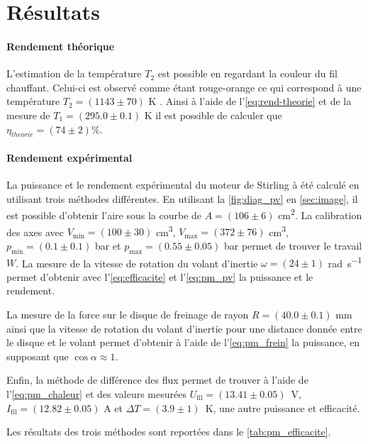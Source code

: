 \section{Résultats}

\paragraph*{Rendement théorique}
L'estimation de la température \(T_2\) est possible en regardant la couleur du fil chauffant. Celui-ci est observé comme étant rouge-orange ce qui correspond à une température \(T_2 = (1143 \pm 70)\) \si{\kelvin} \cite{temp-fil}. Ainsi à l'aide de l'\autoref{eq:rend-theorie} et de la mesure de \(T_1 = (295.0 \pm 0.1)\) \si{\kelvin} il est possible de calculer que \(\eta_{theorie} = (74 \pm 2)\)\%.

\paragraph*{Rendement expérimental}
La puissance et le rendement expérimental du moteur de Stirling à été calculé en utilisant trois méthodes différentes. En utilisant la \autoref{fig:diag_pv} en \autoref{sec:image}, il est possible d'obtenir l'aire sous la courbe de \(A = (106 \pm 6)\) \si{\centi\meter\squared}. La calibration des axes avec \(V_\textrm{min} = (100 \pm 30)\) \si{\centi\meter\cubed}, \(V_\textrm{max} = (372 \pm 76)\) \si{\centi\meter\cubed}, \(p_\textrm{min} = (0.1 \pm 0.1)\) \si{\bar} et \(p_\textrm{max} = (0.55 \pm 0.05)\) \si{\bar} permet de trouver le travail \(W\). La mesure de la vitesse de rotation du volant d'inertie \(\omega = (24 \pm 1)\) \si{\radian\per\second} permet d'obtenir avec l'\autoref{eq:efficacite} et l'\autoref{eq:pm_pv} la puissance et le rendement.

La mesure de la force sur le disque de freinage de rayon \(R = (40.0 \pm 0.1)\) \si{\milli\meter} ainsi que la vitesse de rotation du volant d'inertie pour une distance donnée entre le disque et le volant permet d'obtenir à l'aide de l'\autoref{eq:pm_frein} la puissance, en supposant que \(\cos{\alpha} \approx 1\).

Enfin, la méthode de différence des flux permet de trouver à l'aide de l'\autoref{eq:pm_chaleur} et des valeurs mesurées \mbox{\(U_\textrm{fil} = (13.41 \pm 0.05)\) \si{\volt}}, \mbox{\(I_\textrm{fil} = (12.82 \pm 0.05)\)} \si{\ampere} et \mbox{\(\Delta T = (3.9 \pm 1)\) \si{\kelvin}}, une autre puissance et efficacité.

Les résultats des trois méthodes sont reportées dans le \autoref{tab:pm_efficacite}.

